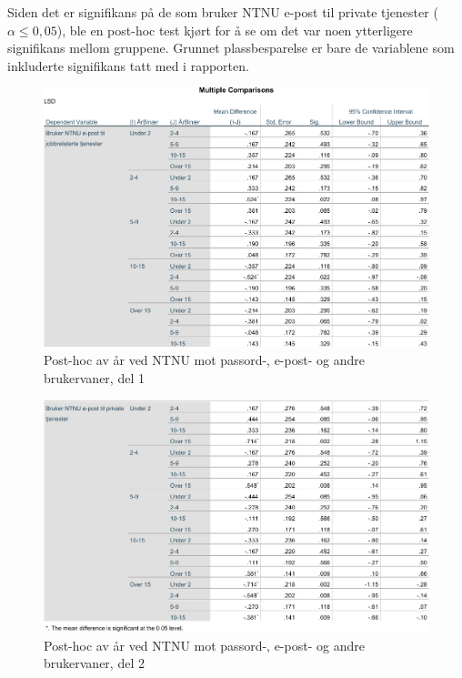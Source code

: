 Siden det er signifikans på de som bruker NTNU e-post til private tjenester (\(\alpha \leq 0,05\)), ble en post-hoc test kjørt for å se om det var noen ytterligere signifikans mellom gruppene. Grunnet plassbesparelse er bare de variablene som inkluderte signifikans tatt med i rapporten. 
\begin{figure}[H]
    \centering
    \includegraphics[scale=0.7]{case_2/bilder/spss/anova_ttest/ansiennitet_diverse_posthoc_1.pdf}
    \caption[ansiennitet-diverse-posthoc-1]{Post-hoc av år ved NTNU mot passord-, e-post- og andre brukervaner, del 1}
    \label{fig:alder-bevissthetogkjennskap-posthoc-1}
\end{figure}

\begin{figure}[H]
    \centering
    \includegraphics[scale=0.7]{case_2/bilder/spss/anova_ttest/ansiennitet_diverse_posthoc_2.pdf}
    \caption[ansiennitet-diverse-posthoc-2]{Post-hoc av år ved NTNU mot passord-, e-post- og andre brukervaner, del 2}
    \label{fig:alder-bevissthetogkjennskap-posthoc-2}
\end{figure}

